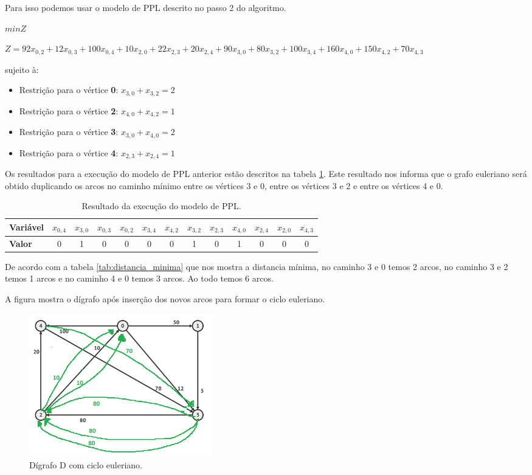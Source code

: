 \documentclass[a4paper, 12pt]{article}
\begin{document}
Para isso podemos usar o modelo de PPL descrito no passo 2 do algoritmo.

	$min Z$

$Z=92x_{0,2}+12x_{0,3}+100x_{0,4}+10x_{2,0}+22x_{2,3}+20x_{2,4}+90x_{3,0}+80x_{3,2}+100x_{3,4}+160x_{4,0}+150x_{4,2}+70x_{4,3}$

sujeito à:
\begin{itemize}
	\item Restrição para o vértice \textbf{0}: $x_{3,0}+x_{3,2}=2$
	\item Restrição para o vértice \textbf{2}: $x_{4,0}+x_{4,2}=1$
	\item Restrição para o vértice \textbf{3}: $x_{3,0}+x_{4,0}=2$
	\item Restrição para o vértice \textbf{4}: $x_{2,3}+x_{2,4}=1$
\end{itemize}

Os resultados para a execução do modelo de PPL anterior estão descritos na tabela \ref{tab:execucao_PPL}.  Este resultado nos informa que o grafo euleriano será obtido duplicando os arcos no caminho mínimo entre os vértices 3 e 0, entre os vértices 3 e 2 e entre os vértices 4 e 0.


	\begin{table}[H]
		\centering
		\begin{tabular}{l c c c c c c c c c c c c}
			\toprule[1.5pt]
			\textbf{Variável}  & $x_{0,4}$ & $x_{3,0}$ & $x_{0,3}$ & $x_{0,2}$ & $x_{3,4}$ & $x_{4,2}$ & $x_{3,2}$ & $x_{2,3}$ &  $x_{4,0}$ & $x_{2,4}$ & $x_{2,0}$ & $ x_{4,3}$\\
			\midrule
			\textbf{Valor}  & 0 & 1 & 0 & 0 & 0 & 0 & 1 & 0 & 1 & 0 & 0 & 0 \\
			
			\bottomrule[1.5pt]
			
		\end{tabular}
		\caption{Resultado da execução do modelo de PPL.}
		\label{tab:execucao_PPL}
	\end{table}


De acordo com a tabela \ref{tab:distancia_minima} que nos mostra a distancia mínima, no caminho 3 e 0 temos 2 arcos, no caminho 3 e 2 temos 1 arcos e no caminho 4 e 0 temos 3 arcos. Ao todo temos 6 arcos.

A figura mostra o dígrafo após inserção dos novos arcos para formar o ciclo euleriano. 
\begin{figure}[H]
	\centering
	\includegraphics[width=8cm]{img/grafoG - Euleriano.png}
	\caption{Dígrafo D com ciclo euleriano.}
	\label{fig:grafoG - Euleriano}
\end{figure}
\end{document}
